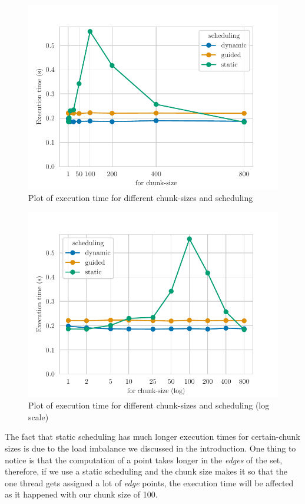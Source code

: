 \begin{figure}[H]
    \centering
    \includegraphics{plots/for-scheduling.pdf}
    \caption{Plot of execution time for different chunk-sizes and scheduling}
    \label{fig:for} 
\end{figure}

\begin{figure}[H]
    \centering
    \includegraphics{plots/for-scheduling_log.pdf}
    \caption{Plot of execution time for different chunk-sizes and scheduling (log scale)}
    \label{fig:for_log} 
\end{figure}

The fact that static scheduling has much longer execution times for certain-chunk sizes is due to the load imbalance
we discussed in the introduction. One thing to notice is that the computation of a point takes longer in the \emph{edges}
of the set, therefore, if we use a static scheduling and the chunk size makes it so that the one thread gets assigned
a lot of \emph{edge} points, the execution time will be affected as it happened with our chunk size of 100. 

